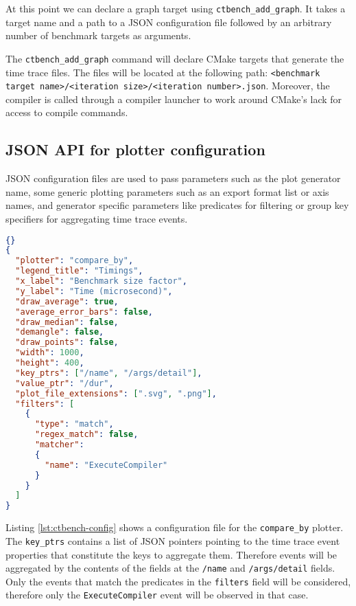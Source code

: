 \documentclass[../../main.tex]{subfiles}
\begin{document}
At this point we can declare a graph target using \lstinline{ctbench_add_graph}.
It takes a target name and a path to a JSON configuration file followed by an
arbitrary number of benchmark targets as arguments.

The \lstinline{ctbench_add_graph} command will declare CMake targets that
generate the time trace files. The files will be located at the following path:
\lstinline{<benchmark target name>/<iteration size>/<iteration number>.json}.
Moreover, the compiler is called through a compiler launcher to work around
CMake's lack for access to compile commands.

\subsection{JSON API for plotter configuration}

JSON configuration files are used to pass parameters such as the plot generator
name, some generic plotting parameters such as an export format list or axis
names, and generator specific parameters like predicates for filtering or group
key specifiers for aggregating time trace events.

\begin{lstlisting}[language=json,
  caption=ctbench configuration file example,
  label=lst:ctbench-config]{}
{
  "plotter": "compare_by",
  "legend_title": "Timings",
  "x_label": "Benchmark size factor",
  "y_label": "Time (microsecond)",
  "draw_average": true,
  "average_error_bars": false,
  "draw_median": false,
  "demangle": false,
  "draw_points": false,
  "width": 1000,
  "height": 400,
  "key_ptrs": ["/name", "/args/detail"],
  "value_ptr": "/dur",
  "plot_file_extensions": [".svg", ".png"],
  "filters": [
    {
      "type": "match",
      "regex_match": false,
      "matcher":
      {
        "name": "ExecuteCompiler"
      }
    }
  ]
}
\end{lstlisting}

Listing \ref{lst:ctbench-config} shows a configuration file for the
\lstinline{compare_by} plotter. The \lstinline{key_ptrs} contains a list of
JSON pointers pointing to the time trace event properties that constitute the
keys to aggregate them. Therefore events will be aggregated by the contents of
the fields at the \lstinline{/name} and \lstinline{/args/detail} fields.
Only the events that match the predicates in the \lstinline{filters} field will
be considered, therefore only the \lstinline{ExecuteCompiler} event will be
observed in that case.
\end{document}
